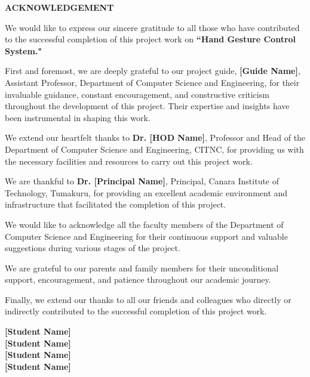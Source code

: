 \documentclass[12pt,a4paper]{report}
\begin{document}
\newpage
\thispagestyle{frontmatter}
\begin{center}
    {\LARGE \textbf{ACKNOWLEDGEMENT}\par}
\end{center}

\vspace{1cm}

We would like to express our sincere gratitude to all those who have contributed to the successful completion of this project work on \textbf{``Hand Gesture Control System."}

First and foremost, we are deeply grateful to our project guide, \textbf{[Guide Name]}, Assistant Professor, Department of Computer Science and Engineering, for their invaluable guidance, constant encouragement, and constructive criticism throughout the development of this project. Their expertise and insights have been instrumental in shaping this work.

We extend our heartfelt thanks to \textbf{Dr. [HOD Name]}, Professor and Head of the Department of Computer Science and Engineering, CITNC, for providing us with the necessary facilities and resources to carry out this project work.

We are thankful to \textbf{Dr. [Principal Name]}, Principal, Canara Institute of Technology, Tumakuru, for providing an excellent academic environment and infrastructure that facilitated the completion of this project.

We would like to acknowledge all the faculty members of the Department of Computer Science and Engineering for their continuous support and valuable suggestions during various stages of the project.

We are grateful to our parents and family members for their unconditional support, encouragement, and patience throughout our academic journey.

Finally, we extend our thanks to all our friends and colleagues who directly or indirectly contributed to the successful completion of this project work.

\vspace{2cm}

\begin{flushright}
\textbf{[Student Name]}\\
\textbf{[Student Name]}\\
\textbf{[Student Name]}\\
\textbf{[Student Name]}
\end{flushright}
\end{document}
